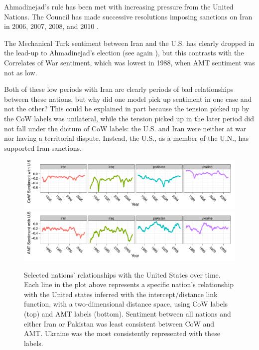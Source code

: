 \begin{itemize}
    Ahmadinejad's rule has been met with increasing pressure from
    the United Nations.  The Council has made successive
    resolutions imposing sanctions on Iran in 2006, 2007, 2008, and
    2010 \citep{iranstate:2012}.

    The Mechanical Turk sentiment between Iran and the U.S. has
    clearly dropped in the lead-up to Ahmadinejad's election (see
    again ), but this contrasts
    with the Correlates of War sentiment, which was lowest in 1988,
    when AMT sentiment was not as low.

\end{itemize}
 
Both of these low periods with Iran are clearly periods of bad
relationships between these nations, but why did one model pick up
sentiment in one case and not the other?  This could be explained in
part because the tension picked up by the CoW labels was unilateral,
while the tension picked up in the later period did not fall under the
dictum of CoW labels: the U.S. and Iran were neither at war nor having
a territorial dispute.  Instead, the U.S., as a member of the U.N., has
supported Iran sanctions.


\begin{figure}
  \center
    \includegraphics[width=1\textwidth]{chapter_foreign_relations/figures/012_fr_cow_mutual_sentiment_with_us.pdf}
    \includegraphics[width=1\textwidth]{chapter_foreign_relations/figures/012_fr_mturk_mutual_sentiment_with_us.pdf}
  \label{fig:nation_positions_over_time}
  \caption{Selected nations' relationships with the United States
    over time.  Each line in the plot above represents a specific
    nation's relationship with the United states inferred with the
    intercept/distance link function, with a two-dimensional distance
    space, using CoW labels (top) and AMT labels (bottom).  Sentiment
    between all nations and either Iran or Pakistan was
    least consistent between CoW and AMT. Ukraine was
    the most consistently represented with these labels.}
\end{figure}

